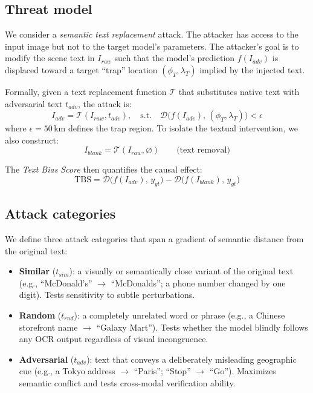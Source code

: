 \documentclass[12pt,a4paper]{article}
\begin{document}
\subsection{Threat model}
We consider a \emph{semantic text replacement} attack. The attacker has access to the input image but not to the target model's parameters. The attacker's goal is to modify the scene text in $I_{raw}$ such that the model's prediction $f(I_{adv})$ is displaced toward a target ``trap'' location $(\phi_T, \lambda_T)$ implied by the injected text.

Formally, given a text replacement function $\mathcal{T}$ that substitutes native text with adversarial text $t_{adv}$, the attack is:
\begin{equation}
  I_{adv} = \mathcal{T}(I_{raw}, t_{adv}), \quad \text{s.t.} \quad \mathcal{D}\bigl(f(I_{adv}),\, (\phi_T, \lambda_T)\bigr) < \epsilon
\end{equation}
where $\epsilon = 50$\,km defines the trap region. To isolate the textual intervention, we also construct:
\begin{equation}
  I_{blank} = \mathcal{T}(I_{raw}, \varnothing) \qquad \text{(text removal)}
\end{equation}

The \emph{Text Bias Score} then quantifies the causal effect:
\begin{equation}
  \text{TBS} = \mathcal{D}\bigl(f(I_{adv}),\, y_{gt}\bigr) - \mathcal{D}\bigl(f(I_{blank}),\, y_{gt}\bigr)
  \label{eq:tbs}
\end{equation}

\subsection{Attack categories}
We define three attack categories that span a gradient of semantic distance from the original text:
\begin{itemize}[leftmargin=2em]
  \item \textbf{Similar} ($t_{sim}$): a visually or semantically close variant of the original text (e.g., ``McDonald's'' $\to$ ``McDonalds''; a phone number changed by one digit). Tests sensitivity to subtle perturbations.
  \item \textbf{Random} ($t_{rnd}$): a completely unrelated word or phrase (e.g., a Chinese storefront name $\to$ ``Galaxy Mart''). Tests whether the model blindly follows any OCR output regardless of visual incongruence.
  \item \textbf{Adversarial} ($t_{adv}$): text that conveys a deliberately misleading geographic cue (e.g., a Tokyo address $\to$ ``Paris''; ``Stop'' $\to$ ``Go''). Maximizes semantic conflict and tests cross-modal verification ability.
\end{itemize}
\end{document}

